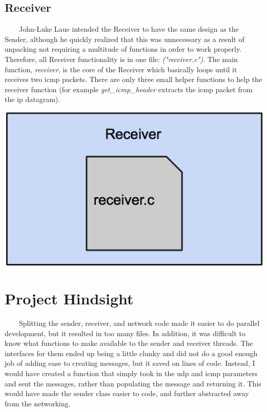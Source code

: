 \documentclass[11pt]{article}
\begin{document}
\subsection{Receiver}
\ \ \ \ John-Luke Laue intended the Receiver to have the same design as the Sender, although he quickly realized that this was unnecessary as a result of unpacking not requiring a multitude of functions in order to work properly. Therefore, all Receiver functionality is in one file: \textit{("receiver.c")}. The main function,  \textit{receiver}, is the core of the Receiver which basically loops until it receives two icmp packets. There are only three small helper functions to help the receiver function (for example \textit{get\_icmp\_header} extracts the icmp packet from the ip datagram).
\begin{center}
\includegraphics[scale=0.3]{images/receiver-design.png}
\end{center}

\section{Project Hindsight}
\ \ \ \ Splitting the sender, receiver, and network code made it easier to do parallel development, but it resulted in too many files. In addition, it was difficult to know what functions to make available to the sender and receiver threads. The interfaces for them ended up being a little clunky and did not do a good enough job of adding ease to creating messages, but it saved on lines of code. Instead, I would have created a function that simply took in the udp and icmp parameters and sent the messages, rather than populating the message and returning it. This would have made the sender class easier to code, and further abstracted away from the networking. 
\ \ \ \ 
\end{document}
